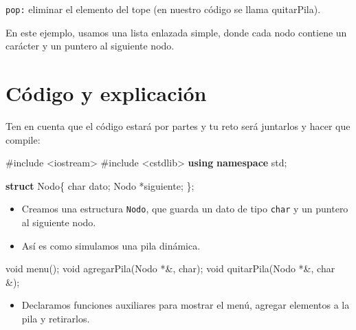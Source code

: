 \documentclass[
  11pt,
  a4paper,
  DIV=11,
  numbers=noendperiod]{scrreprt}
\newenvironment{Shaded}{\begin{snugshade}}{\end{snugshade}}
\newcommand{\DataTypeTok}[1]{\textcolor[rgb]{0.68,0.00,0.00}{#1}}
\newcommand{\ImportTok}[1]{\textcolor[rgb]{0.00,0.46,0.62}{#1}}
\newcommand{\KeywordTok}[1]{\textcolor[rgb]{0.00,0.23,0.31}{\textbf{#1}}}
\newcommand{\NormalTok}[1]{\textcolor[rgb]{0.00,0.23,0.31}{#1}}
\newcommand{\OperatorTok}[1]{\textcolor[rgb]{0.37,0.37,0.37}{#1}}
\newcommand{\PreprocessorTok}[1]{\textcolor[rgb]{0.68,0.00,0.00}{#1}}
\providecommand{\tightlist}{%
  \setlength{\itemsep}{0pt}\setlength{\parskip}{0pt}}
\begin{document}
\texttt{pop:} eliminar el elemento del tope (en nuestro código se llama
quitarPila).

En este ejemplo, usamos una lista enlazada simple, donde cada nodo
contiene un carácter y un puntero al siguiente nodo.

\section{Código y explicación}\label{cuxf3digo-y-explicaciuxf3n}

Ten en cuenta que el código estará por partes y tu reto será juntarlos y
hacer que compile:

\begin{Shaded}
\begin{Highlighting}[]
\PreprocessorTok{\#include }\ImportTok{\textless{}iostream\textgreater{}}
\PreprocessorTok{\#include }\ImportTok{\textless{}cstdlib\textgreater{}}
\KeywordTok{using} \KeywordTok{namespace}\NormalTok{ std}\OperatorTok{;}

\KeywordTok{struct}\NormalTok{ Nodo}\OperatorTok{\{}
    \DataTypeTok{char}\NormalTok{ dato}\OperatorTok{;}
\NormalTok{    Nodo }\OperatorTok{*}\NormalTok{siguiente}\OperatorTok{;}
\OperatorTok{\};}
\end{Highlighting}
\end{Shaded}

\begin{itemize}
\item
  Creamos una estructura \texttt{Nodo}, que guarda un dato de tipo
  \texttt{char} y un puntero al siguiente nodo.
\item
  Así es como simulamos una pila dinámica.
\end{itemize}

\begin{Shaded}
\begin{Highlighting}[]
\DataTypeTok{void}\NormalTok{ menu}\OperatorTok{();}
\DataTypeTok{void}\NormalTok{ agregarPila}\OperatorTok{(}\NormalTok{Nodo }\OperatorTok{*\&,} \DataTypeTok{char}\OperatorTok{);}
\DataTypeTok{void}\NormalTok{ quitarPila}\OperatorTok{(}\NormalTok{Nodo }\OperatorTok{*\&,} \DataTypeTok{char} \OperatorTok{\&);}
\end{Highlighting}
\end{Shaded}

\begin{itemize}
\tightlist
\item
  Declaramos funciones auxiliares para mostrar el menú, agregar
  elementos a la pila y retirarlos.
\end{itemize}
\end{document}
